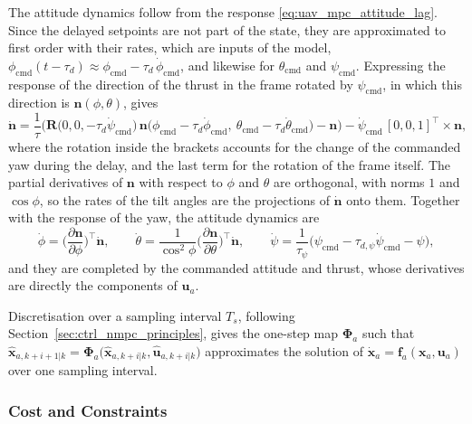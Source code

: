 The attitude dynamics follow from the response \eqref{eq:uav_mpc_attitude_lag}. Since the delayed setpoints are not part of the state, they are approximated to first order with their rates, which are inputs of the model, $\phi_{\mathrm{cmd}}(t-\tau_d) \approx \phi_{\mathrm{cmd}} - \tau_d\,\dot\phi_{\mathrm{cmd}}$, and likewise for $\theta_{\mathrm{cmd}}$ and $\psi_{\mathrm{cmd}}$. Expressing the response of the direction of the thrust in the frame rotated by $\psi_{\mathrm{cmd}}$, in which this direction is $\mathbf{n}(\phi,\theta)$, gives
\begin{equation}
    \dot{\mathbf{n}} = \frac{1}{\tau}\Big(\mathbf{R}\big(0,0,-\tau_d\dot\psi_{\mathrm{cmd}}\big)\,\mathbf{n}\big(\phi_{\mathrm{cmd}}-\tau_d\dot\phi_{\mathrm{cmd}},\ \theta_{\mathrm{cmd}}-\tau_d\dot\theta_{\mathrm{cmd}}\big) - \mathbf{n}\Big) - \dot\psi_{\mathrm{cmd}}\,[0,0,1]^\top \times \mathbf{n},
    \label{eq:uav_mpc_tilt_rate}
\end{equation}
where the rotation inside the brackets accounts for the change of the commanded yaw during the delay, and the last term for the rotation of the frame itself. The partial derivatives of $\mathbf{n}$ with respect to $\phi$ and $\theta$ are orthogonal, with norms $1$ and $\cos\phi$, so the rates of the tilt angles are the projections of $\dot{\mathbf{n}}$ onto them. Together with the response of the yaw, the attitude dynamics are
\begin{equation}
    \dot\phi = \Big(\frac{\partial\mathbf{n}}{\partial\phi}\Big)^{\!\top}\dot{\mathbf{n}}, \qquad \dot\theta = \frac{1}{\cos^2\phi}\Big(\frac{\partial\mathbf{n}}{\partial\theta}\Big)^{\!\top}\dot{\mathbf{n}}, \qquad \dot\psi = \frac{1}{\tau_\psi}\big(\psi_{\mathrm{cmd}} - \tau_{d,\psi}\dot\psi_{\mathrm{cmd}} - \psi\big),
    \label{eq:uav_mpc_attitude_dynamics}
\end{equation}
and they are completed by the commanded attitude and thrust, whose derivatives are directly the components of $\mathbf{u}_a$.

Discretisation over a sampling interval $T_s$, following Section~\ref{sec:ctrl_nmpc_principles}, gives the one-step map $\boldsymbol\Phi_a$ such that $\hat{\mathbf{x}}_{a,k+i+1|k} = \boldsymbol\Phi_a\big(\hat{\mathbf{x}}_{a,k+i|k},\hat{\mathbf{u}}_{a,k+i|k}\big)$ approximates the solution of $\dot{\mathbf{x}}_a = \mathbf{f}_a(\mathbf{x}_a,\mathbf{u}_a)$ over one sampling interval.

\subsubsection*{Cost and Constraints}

